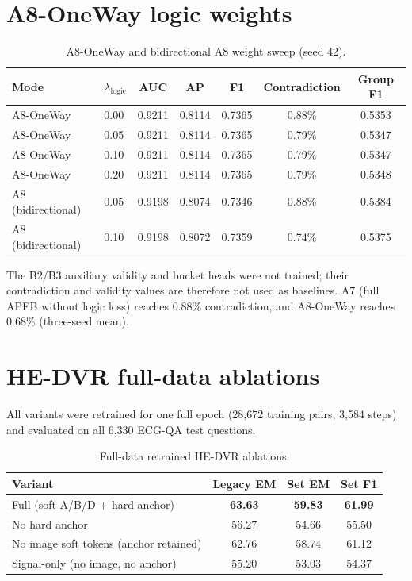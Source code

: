 \documentclass[11pt]{article}
\begin{document}
\section{A8-OneWay logic weights}
\begin{table}[h]
\centering
\caption{A8-OneWay and bidirectional A8 weight sweep (seed 42).}
\begin{tabular}{llccccc}
\toprule
Mode & $\lambda_{\text{logic}}$ & AUC & AP & F1 & Contradiction & Group F1 \\
\midrule
A8-OneWay & 0.00 & 0.9211 & 0.8114 & 0.7365 & 0.88\% & 0.5353 \\
A8-OneWay & 0.05 & 0.9211 & 0.8114 & 0.7365 & 0.79\% & 0.5347 \\
A8-OneWay & 0.10 & 0.9211 & 0.8114 & 0.7365 & 0.79\% & 0.5347 \\
A8-OneWay & 0.20 & 0.9211 & 0.8114 & 0.7365 & 0.79\% & 0.5348 \\
A8 (bidirectional) & 0.05 & 0.9198 & 0.8074 & 0.7346 & 0.88\% & 0.5384 \\
A8 (bidirectional) & 0.10 & 0.9198 & 0.8072 & 0.7359 & 0.74\% & 0.5375 \\
\bottomrule
\end{tabular}
\end{table}

The B2/B3 auxiliary validity and bucket heads were not trained; their contradiction and validity values are therefore not used as baselines. A7 (full APEB without logic loss) reaches 0.88\% contradiction, and A8-OneWay reaches 0.68\% (three-seed mean).

\section{HE-DVR full-data ablations}
All variants were retrained for one full epoch (28,672 training pairs, 3,584 steps) and evaluated on all 6,330 ECG-QA test questions.

\begin{table}[h]
\centering
\caption{Full-data retrained HE-DVR ablations.}
\begin{tabular}{lccc}
\toprule
Variant & Legacy EM & Set EM & Set F1 \\
\midrule
Full (soft A/B/D + hard anchor) & \textbf{63.63} & \textbf{59.83} & \textbf{61.99} \\
No hard anchor & 56.27 & 54.66 & 55.50 \\
No image soft tokens (anchor retained) & 62.76 & 58.74 & 61.12 \\
Signal-only (no image, no anchor) & 55.20 & 53.03 & 54.37 \\
\bottomrule
\end{tabular}
\end{table}
\end{document}

